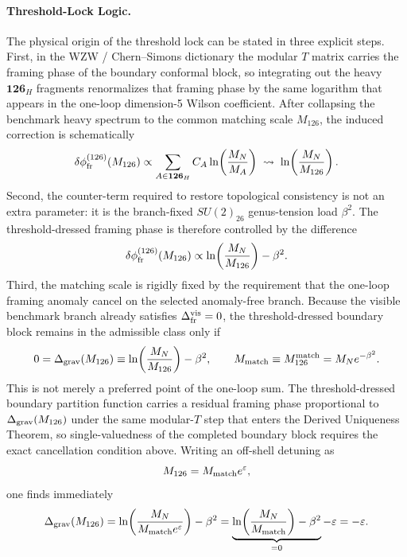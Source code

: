 \documentclass[11pt]{article}
\begin{document}
\paragraph{Threshold-Lock Logic.}
The physical origin of the threshold lock can be stated in three explicit steps. First, in the WZW / Chern--Simons dictionary the modular $T$ matrix carries the framing phase of the boundary conformal block, so integrating out the heavy $\mathbf{126}_H$ fragments renormalizes that framing phase by the same logarithm that appears in the one-loop dimension-5 Wilson coefficient. After collapsing the benchmark heavy spectrum to the common matching scale $M_{126}$, the induced correction is schematically
\begin{equation}
 \delta\phi_{\rm fr}^{(126)}(M_{126})
 \propto
 \sum_{A\in \mathbf{126}_H} C_A\ln\!\left(\frac{M_N}{M_A}\right)
 \;\leadsto\;
 \ln\!\left(\frac{M_N}{M_{126}}\right).
\end{equation}
Second, the counter-term required to restore topological consistency is not an extra parameter: it is the branch-fixed $SU(2)_{26}$ genus-tension load $\beta^2$. The threshold-dressed framing phase is therefore controlled by the difference
\begin{equation}
 \delta\phi_{\rm fr}^{(126)}(M_{126})
 \propto
 \ln\!\left(\frac{M_N}{M_{126}}\right)-\beta^2.
\end{equation}
Third, the matching scale is rigidly fixed by the requirement that the one-loop
framing anomaly cancel on the selected anomaly-free branch. Because the visible
benchmark branch already satisfies $\Delta_{\rm fr}^{\rm vis}=0$, the
threshold-dressed boundary block remains in the admissible class only if
\begin{equation}
 0
 =
 \Delta_{\rm grav}(M_{126})
 \equiv
 \ln\!\left(\frac{M_N}{M_{126}}\right)-\beta^2,
 \qquad
 M_{\rm match}\equiv M_{126}^{\rm match}=M_Ne^{-\beta^2}.
\end{equation}
This is not merely a preferred point of the one-loop sum. The threshold-dressed
boundary partition function carries a residual framing phase proportional to
$\Delta_{\rm grav}(M_{126})$ under the same modular-$T$ step that enters the
Derived Uniqueness Theorem, so single-valuedness of the completed
boundary block requires the exact cancellation condition above. Writing an
off-shell detuning as
\begin{equation}
 M_{126}=M_{\rm match}e^{\varepsilon},
\end{equation}
one finds immediately
\begin{equation}
 \Delta_{\rm grav}(M_{126})
 =
 \ln\!\left(\frac{M_N}{M_{\rm match}e^{\varepsilon}}\right)-\beta^2
 =
 \underbrace{\ln\!\left(\frac{M_N}{M_{\rm match}}\right)-\beta^2}_{=0}
 -\varepsilon
 = -\varepsilon.
\end{equation}
\end{document}
